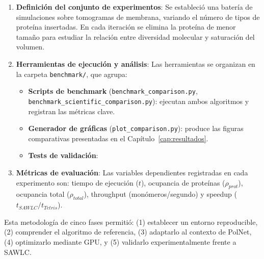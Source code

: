 \begin{enumerate}
    \item \textbf{Definición del conjunto de experimentos}: Se estableció una batería de simulaciones sobre tomogramas de membrana, variando el número de tipos de proteína insertadas. En cada iteración se elimina la proteína de menor tamaño para estudiar la relación entre diversidad molecular y saturación del volumen.

    \item \textbf{Herramientas de ejecución y análisis}: Las herramientas se organizan en la carpeta \texttt{benchmark/}, que agrupa:
    \begin{itemize}
        \item \textbf{Scripts de benchmark} (\texttt{benchmark\_comparison.py}, \texttt{benchmark\_scientific\_comparison.py}): ejecutan ambos algoritmos y registran las métricas clave.
        \item \textbf{Generador de gráficas} (\texttt{plot\_comparison.py}): produce las figuras comparativas presentadas en el Capítulo~\ref{cap:resultados}.
        \item \textbf{Tests de validación}: %
    \end{itemize}

    \item \textbf{Métricas de evaluación}: Las variables dependientes registradas en cada experimento son: tiempo de ejecución ($t$), ocupancia de proteínas ($\rho_{prot}$), ocupancia total ($\rho_{total}$), throughput (monómeros/segundo) y speedup ($t_{SAWLC}/t_{Tetris}$).
\end{enumerate}

Esta metodología de cinco fases permitió: (1) establecer un entorno reproducible, (2) comprender el algoritmo de referencia, (3) adaptarlo al contexto de PolNet, (4) optimizarlo mediante GPU, y (5) validarlo experimentalmente frente a SAWLC.
